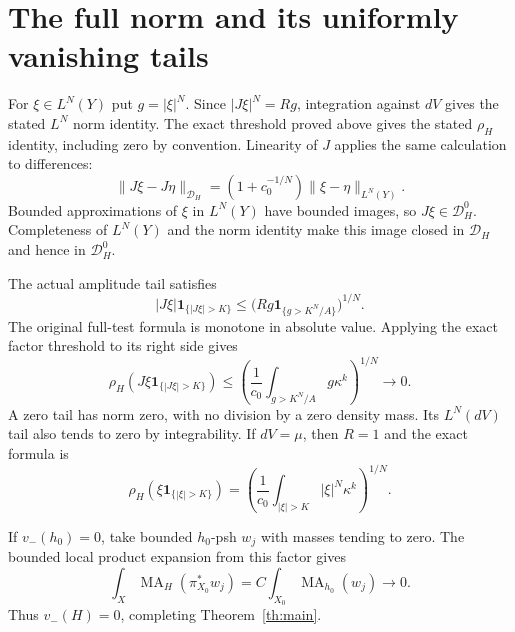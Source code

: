 \documentclass[11pt]{article}
\newcommand{\MA}{\operatorname{MA}}
\theoremstyle{remark}\newtheorem{remark}[theorem]{Remark}
\begin{document}
\section{The full norm and its uniformly vanishing tails}
For $\xi\in L^N(Y)$ put $g=|\xi|^N$. Since
$|J\xi|^N=Rg$, integration against $dV$ gives the stated $L^N$ norm
identity. The exact threshold proved above gives the stated
$\rho_H$ identity, including zero by convention. Linearity of $J$
applies the same calculation to differences:
\[
 \|J\xi-J\eta\|_{\mathcal D_H}
 =(1+c_0^{-1/N})\|\xi-\eta\|_{L^N(Y)}.
\]
Bounded approximations of $\xi$ in $L^N(Y)$ have bounded images,
so $J\xi\in\mathcal D_H^0$. Completeness of $L^N(Y)$ and the norm
identity make this image closed in $\mathcal D_H$ and hence in
$\mathcal D_H^0$.

The actual amplitude tail satisfies
\[
 |J\xi|\mathbf1_{\{|J\xi|>K\}}
 \leq\bigl(Rg\mathbf1_{\{g>K^N/A\}}\bigr)^{1/N}.
\]
The original full-test formula is monotone in absolute value.
Applying the exact factor threshold to its right side gives
\begin{equation}\label{eq:tail}
 \rho_H(J\xi\mathbf1_{\{|J\xi|>K\}})
 \leq\left(\frac1{c_0}
      \int_{g>K^N/A}g\kappa^k\right)^{1/N}\longrightarrow0.
\end{equation}
A zero tail has norm zero, with no division by a zero density mass.
Its $L^N(dV)$ tail also tends to zero by integrability. If $dV=\mu$,
then $R=1$ and the exact formula is
\[
 \rho_H(\xi\mathbf1_{\{|\xi|>K\}})
 =\left(\frac1{c_0}\int_{|\xi|>K}|\xi|^N\kappa^k\right)^{1/N}.
\]

If $v_-(h_0)=0$, take bounded $h_0$-psh $w_j$ with masses tending
to zero. The bounded local product expansion from this factor gives
\[
 \int_X\MA_H(\pi_{X_0}^*w_j)
       =C\int_{X_0}\MA_{h_0}(w_j)\longrightarrow0.
\]
Thus $v_-(H)=0$, completing Theorem~\ref{th:main}.
\end{document}
